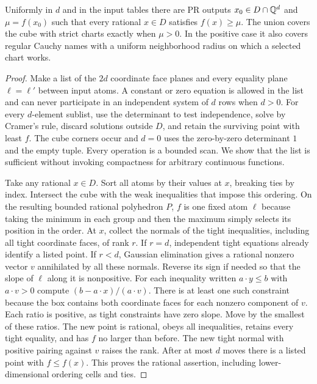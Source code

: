\begin{thm}\label{th:atlas}
Uniformly in $d$ and in the input tables there are PR outputs $x_0\in D\cap\mathbb Q^d$ and $\mu=f(x_0)$ such that every rational $x\in D$ satisfies $f(x)\ge\mu$. The union covers the cube with strict charts exactly when $\mu>0$. In the positive case it also covers regular Cauchy names with a uniform neighborhood radius on which a selected chart works.
\end{thm}
\begin{proof}
Make a list of the $2d$ coordinate face planes and every equality plane $\ell=\ell'$ between input atoms. A constant or zero equation is allowed in the list and can never participate in an independent system of $d$ rows when $d>0$. For every $d$-element sublist, use the determinant to test independence, solve by Cramer's rule, discard solutions outside $D$, and retain the surviving point with least $f$. The cube corners occur and $d=0$ uses the zero-by-zero determinant $1$ and the empty tuple. Every operation is a bounded scan. We show that the list is sufficient without invoking compactness for arbitrary continuous functions.

Take any rational $x\in D$. Sort all atoms by their values at $x$, breaking ties by index. Intersect the cube with the weak inequalities that impose this ordering. On the resulting bounded rational polyhedron $P$, $f$ is one fixed atom $\ell$ because taking the minimum in each group and then the maximum simply selects its position in the order. At $x$, collect the normals of the tight inequalities, including all tight coordinate faces, of rank $r$. If $r=d$, independent tight equations already identify a listed point. If $r<d$, Gaussian elimination gives a rational nonzero vector $v$ annihilated by all these normals. Reverse its sign if needed so that the slope of $\ell$ along it is nonpositive. For each inequality written $a\cdot y\le b$ with $a\cdot v>0$ compute $(b-a\cdot x)/(a\cdot v)$. There is at least one such constraint because the box contains both coordinate faces for each nonzero component of $v$. Each ratio is positive, as tight constraints have zero slope. Move by the smallest of these ratios. The new point is rational, obeys all inequalities, retains every tight equality, and has $f$ no larger than before. The new tight normal with positive pairing against $v$ raises the rank. After at most $d$ moves there is a listed point with $f\le f(x)$. This proves the rational assertion, including lower-dimensional ordering cells and ties.


\end{proof}
